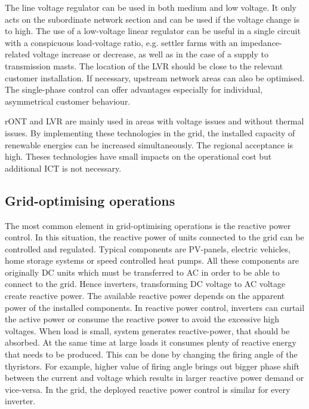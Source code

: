 The line voltage regulator can be used in both medium and low voltage. It only acts on the subordinate network section and can be used if the voltage change is to high.  The use of a low-voltage linear regulator can be useful in a single circuit with a conspicuous load-voltage ratio, e.g. settler farms with an impedance-related voltage increase or decrease, as well as in the case of a supply to transmission masts. The location of the LVR should be close to the relevant customer installation. If necessary, upstream network areas can also be optimised. The single-phase control can offer advantages especially for individual, asymmetrical customer behaviour. 

rONT and LVR are mainly used in areas with voltage issues and without thermal issues. By implementing these technologies in the grid, the installed capacity of renewable energies can be increased simultaneously. The regional acceptance is high. Theses technologies have small impacts on the operational cost but additional ICT is not necessary.~\cite{monamaßnahmen}

\subsection{Grid-optimising operations}

The most common element in grid-optimising operations is the reactive power control. In this situation, the reactive power of units connected to the grid can be controlled and regulated. Typical components are PV-panels, electric vehicles, home storage systems or speed controlled heat pumps. All these components are originally DC units which must be transferred to AC in order to be able to connect to the grid. Hence inverters, transforming DC voltage to AC voltage create reactive power. The available reactive power depends on the apparent power of the installed components. In reactive power control, inverters can curtail the active power or consume the reactive power to avoid the excessive high voltages. When load is small, system generates reactive-power, that should be absorbed. At the same time at large loads it consumes plenty of reactive energy that needs to be produced. This can be done by changing the firing angle of the thyristors. For example, higher value of firing angle brings out bigger phase shift between the current and voltage which results in larger reactive power demand or vice-versa. In the grid, the deployed reactive power control is similar for every inverter.~\cite{power_transmission,mona}

